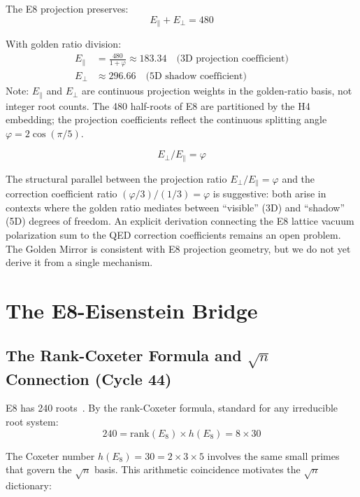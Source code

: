 \documentclass[aps,prd,twocolumn,superscriptaddress,floatfix,nofootinbib]{revtex4-2}
\theoremstyle{definition}
\theoremstyle{remark}
\newcommand{\vp}{\varphi}
\begin{document}
The E8 projection preserves:
\begin{equation}
E_\parallel + E_\perp = 480
\end{equation}

With golden ratio division:
\begin{align}
E_\parallel &= \frac{480}{1 + \vp} \approx 183.34 \quad \text{(3D projection coefficient)} \\
E_\perp &\approx 296.66 \quad \text{(5D shadow coefficient)}
\end{align}
\noindent Note: $E_\parallel$ and $E_\perp$ are continuous projection weights in the golden-ratio basis, not integer root counts. The 480 half-roots of E8 are partitioned by the H4 embedding; the projection coefficients reflect the continuous splitting angle $\vp = 2\cos(\pi/5)$.

\begin{equation}
E_\perp / E_\parallel = \vp
\end{equation}

The structural parallel between the projection ratio $E_\perp/E_\parallel = \vp$ and the correction coefficient ratio $(\vp/3)/(1/3) = \vp$ is suggestive: both arise in contexts where the golden ratio mediates between ``visible'' (3D) and ``shadow'' (5D) degrees of freedom. An explicit derivation connecting the E8 lattice vacuum polarization sum to the QED correction coefficients remains an open problem. The Golden Mirror is consistent with E8 projection geometry, but we do not yet derive it from a single mechanism.

\section{The E8-Eisenstein Bridge}

\subsection{The Rank-Coxeter Formula and $\sqrt{n}$ Connection (Cycle 44)}

E8 has 240 roots~\cite{e8}. By the rank-Coxeter formula, standard for any irreducible root system:
\begin{equation}
240 = \mathrm{rank}(E_8) \times h(E_8) = 8 \times 30
\end{equation}

The Coxeter number $h(E_8) = 30 = 2 \times 3 \times 5$ involves the same small primes that
govern the $\sqrt{n}$ basis. This arithmetic coincidence motivates the $\sqrt{n}$ dictionary:
\end{document}
